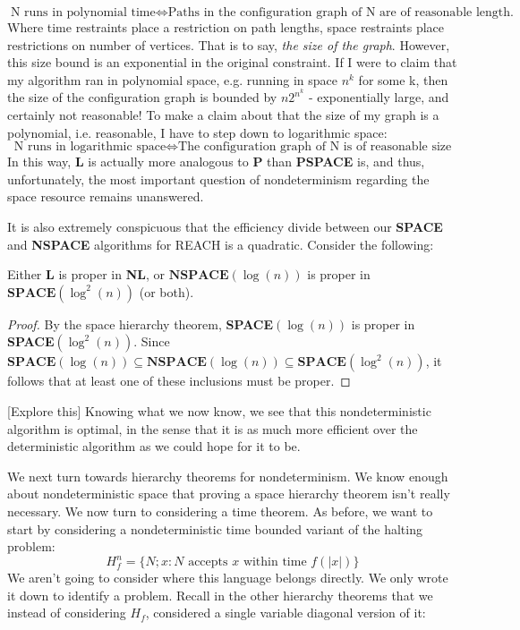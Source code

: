 \[\textrm{N runs in polynomial time} \iff \textrm{Paths in the configuration graph of N are of reasonable length.} \]
Where time restraints place a restriction on path lengths, space restraints place restrictions on number of vertices. That is to say, \textit{the size of the graph}. However, this size bound is an exponential in the original constraint. If I were to claim that my algorithm ran in polynomial space, e.g. running in space $n^k$ for some k, then the size of the configuration graph is bounded by $n2^{n^k}$ - exponentially large, and certainly not reasonable! To make a claim about that the size of my graph is a polynomial, i.e. reasonable, I have to step down to logarithmic space:
\[\textrm{N runs in logarithmic space} \iff \textrm{The configuration graph of N is of reasonable size} \]
In this way, \textbf{L} is actually more analogous to \textbf{P} than \textbf{PSPACE} is, and thus, unfortunately, the most important question of nondeterminism regarding the space resource remains unanswered.
\par It is also extremely conspicuous that the efficiency divide between our \textbf{SPACE} and \textbf{NSPACE} algorithms for REACH is a quadratic. Consider the following:
\begin{corollary}
	Either \textbf{L} is proper in \textbf{NL}, or $\textbf{NSPACE}(\log(n))$ is proper in $\textbf{SPACE}(\log^2(n))$ (or both).
\end{corollary}
\begin{proof}
	By the space hierarchy theorem, \textbf{SPACE}$(\log(n))$ is proper in \textbf{SPACE}$(\log^2(n))$. Since $\textbf{SPACE}(\log(n)) \subseteq \textbf{NSPACE}(\log(n)) \subseteq \textbf{SPACE}(\log^2(n))$, it follows that at least one of these inclusions must be proper.
\end{proof}
[Explore this] Knowing what we now know, we see that this nondeterministic algorithm is optimal, in the sense that it is as much more efficient over the deterministic algorithm as we could hope for it to be.
\par We next turn towards hierarchy theorems for nondeterminism. We know enough about nondeterministic space that proving a space hierarchy theorem isn't really necessary. We now turn to considering a time theorem. As before, we want to start by considering a nondeterministic time bounded variant of the halting problem:
\[ H^n_f = \{N;x: \textrm{$N$ accepts $x$ within time $f(|x|)$} \} \]
We aren't going to consider where this language belongs directly. We only wrote it down to identify a problem. Recall in the other hierarchy theorems that we instead of considering $H_f$, considered a single variable diagonal version of it:
